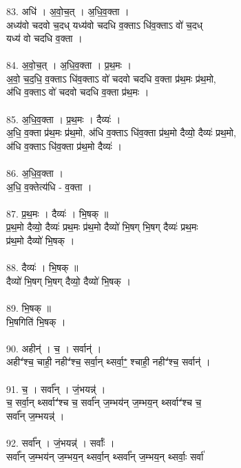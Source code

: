 \subsubsection{}
83. अधि॑ । अ॒वो॒च॒त् । अ॒धि॒व॒क्ता ।\\
अध्य॑वो चदवो च॒दध् यध्य॑वो चदधि व॒क्ताऽ धि॑व॒क्ताऽ वो॑ च॒दध्\\
यध्य॑ वो चदधि व॒क्ता ।\\
\\
84. अ॒वो॒च॒त् । अ॒धि॒व॒क्ता । प्र॒थ॒मः ।\\
अ॒वो॒ च॒द॒धि॒ व॒क्ताऽ धि॑व॒क्ताऽ वो॑ चदवो चदधि व॒क्ता प्र॑थ॒मः प्र॑थ॒मो,\\
अ॑धि व॒क्ताऽ वो॑ चदवो चदधि व॒क्ता प्र॑थ॒मः ।\\
\\
85. अ॒धि॒व॒क्ता । प्र॒थ॒मः । दैव्यः॑ ।\\
अ॒धि॒ व॒क्ता प्र॑थ॒मः प्र॑थ॒मो, अ॑धि व॒क्ताऽ धि॑व॒क्ता प्र॑थ॒मो दैव्यो॒ दैव्यः॑ प्रथ॒मो,\\
अ॑धि व॒क्ताऽ धि॑व॒क्ता प्र॑थ॒मो दैव्यः॑ ।\\
\\
86. अ॒धि॒व॒क्ता ।\\
अ॒धि॒ व॒क्तेत्य॑धि - व॒क्ता ।\\
\\
87. प्र॒थ॒मः । दैव्यः॑ । भि॒षक् ॥\\
प्र॒थ॒मो दैव्यो॒ दैव्यः॑ प्रथ॒मः प्र॑थ॒मो दैव्यो॑ भि॒षग् भि॒षग् दैव्यः॑ प्रथ॒मः\\
प्र॑थ॒मो दैव्यो॑ भि॒षक् ।\\
\\
88. दैव्यः॑ । भि॒षक् ॥\\
दैव्यो॑ भि॒षग् भि॒षग् दैव्यो॒ दैव्यो॑ भि॒षक् ।\\
\\
89. भि॒षक् ॥\\
भि॒षगिति॑ भि॒षक् ।\\
\\
90. अहीन्॑ । च॒ । सर्वान्॑ ।\\
अहीꣲ॑श्च॒ चाही॒ नहीꣲ॑श्च॒ सर्वा॒न् थ्सर्वा॒ꣲ॒ श्चाही॒ नहीꣲ॑श्च॒ सर्वान्॑ ।\\
\\
91. च॒ । सर्वा᳚न् । जं॒भयन्न्॑ ।\\
च॒ सर्वा॒न् थ्सर्वाꣲ॑श्च च॒ सर्वा᳚न् ज॒म्भय॑न् ज॒म्भय॒न् थ्सर्वाꣲ॑श्च च॒\\
सर्वा᳚न् ज॒म्भयन्न्॑ ।\\
\\
92. सर्वा᳚न् । जं॒भयन्न्॑ । सर्वाः᳚ ।\\
सर्वा᳚न् ज॒म्भय॑न् ज॒म्भय॒न् थ्सर्वा॒न् थ्सर्वा᳚न् ज॒म्भय॒न् थ्सर्वाः॒ सर्वा॑\\
